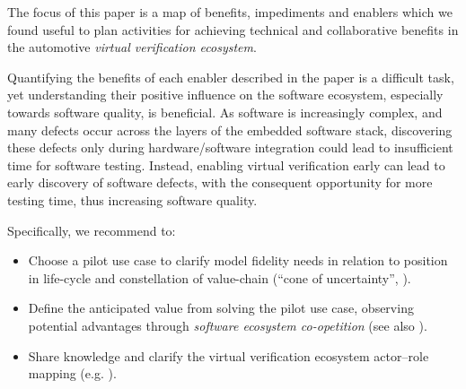 The focus of this paper is a map of benefits, impediments and enablers which we found useful to plan activities for achieving technical and collaborative benefits in the automotive \emph{virtual verification ecosystem}.

Quantifying the benefits of each enabler described in the paper is a difficult task,
yet understanding their positive influence on the software ecosystem, especially towards software quality, is beneficial.
As software is increasingly complex, and many defects occur across the layers of the embedded software stack, discovering these defects only during hardware/software integration could lead to %
insufficient time for software testing.
Instead, enabling %
virtual verification %
early %
can lead to early discovery of software defects, with the consequent opportunity for more testing time, thus increasing %
software quality.

Specifically, we recommend to:
\begin{itemize}
    \item Choose a pilot use case to clarify model fidelity needs in relation to position in life-cycle and constellation of value-chain (``cone of uncertainty'', \cite{Boehm1981}).
    \item Define the anticipated value from solving the pilot use case, observing potential advantages through \emph{software ecosystem co-opetition} (see also \cite{Agerfalk2008}).
    \item %
    {Share} knowledge and clarify %
    the {virtual verification ecosystem} actor--role mapping (e.g. \cite{kilamo2012proprietary}).
\end{itemize}

